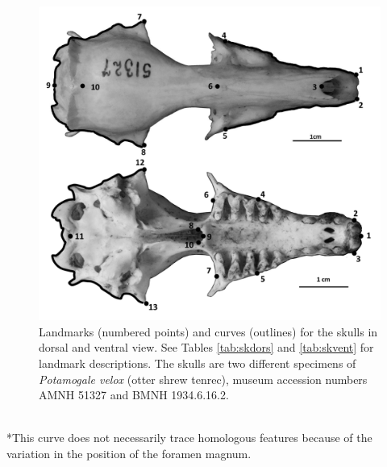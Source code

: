 \begin{figure}[!htbp]
	\centering
	\includegraphics[width=1\linewidth]{Methods/figures/Skdors+Skvent_combined_BW.png}
	\caption[Skulls: dorsal and ventral landmarks]
	{Landmarks (numbered points) and curves (outlines) for the skulls in dorsal and ventral view. See Tables \ref{tab:skdors} and \ref{tab:skvent} for landmark descriptions. The skulls are two different specimens of \textit{Potamogale velox} (otter shrew tenrec), museum accession numbers AMNH 51327 and BMNH 1934.6.16.2. }
	\label{fig:skdors_skvent}
\end{figure}


\begin{table}[h]
	\caption[Skulls: dorsal landmarks]
		{Descriptions of the landmarks (points) and curves (semilandmarks) for the skulls in dorsal view (Figure
		\ref{fig:skdors_skvent})} 
	
	\label{tab:skdors}
\end{table}

\begin{table}[!htb] %
\caption[Skulls: ventral landmarks]
		{Descriptions of the landmarks (points) and curves (semilandmarks) for the skulls in ventral view (Figure \ref{fig:skdors_skvent}).} 

\label{tab:skvent}
\\
*This curve does not necessarily trace homologous features because of the variation in the position of the foramen magnum.
\end{table}

